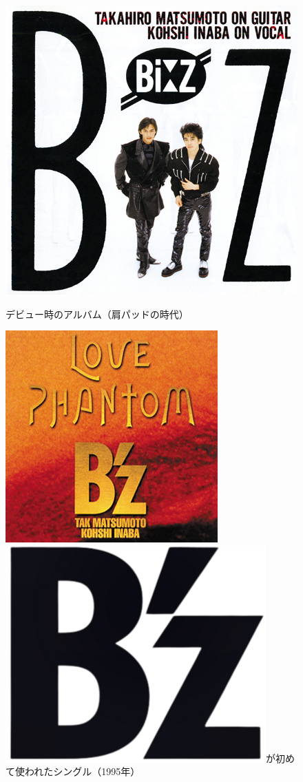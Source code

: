 \documentclass[a4paper,uplatex,dvipdfmx]{jsarticle}
\theoremstyle{definition}
\begin{document}
\begin{figure}[ht]  
  \centering
  \begin{minipage}[t]{0.32\columnwidth}
    \centering
    \includegraphics[width=.7\hsize]{fig/Bz/bz.png}
    \caption{デビュー時のアルバム（肩パッドの時代）}
    \label{Bz}
  \end{minipage}
  \begin{minipage}[t]{0.32\columnwidth}
    \centering
    \includegraphics[width=.7\hsize]{fig/Bz/lovephantom.png}
    \caption{\includegraphics[width=0.05\linewidth]{fig/Bz/logo.png}が初めて使われたシングル（1995年）}
    \label{lovephantom}
  \end{minipage}
  \begin{minipage}[t]{0.32\columnwidth}

\end{minipage}
\end{figure}
\end{document}
